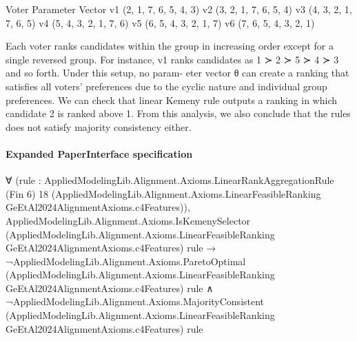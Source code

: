 \documentclass[10pt]{article}
\begin{document}
\begin{ReviewVerbatim}
                                      Voter    Parameter Vector
                                        v1     (2, 1, 7, 6, 5, 4, 3)
                                        v2     (3, 2, 1, 7, 6, 5, 4)
                                        v3     (4, 3, 2, 1, 7, 6, 5)
                                        v4     (5, 4, 3, 2, 1, 7, 6)
                                        v5     (6, 5, 4, 3, 2, 1, 7)
                                        v6     (7, 6, 5, 4, 3, 2, 1)

Each voter ranks candidates within the group in increasing order except for a single reversed group.
For instance, v1 ranks candidates as 1 ≻ 2 ≻ 5 ≻ 4 ≻ 3 and so forth. Under this setup, no param-
eter vector θ can create a ranking that satisfies all voters’ preferences due to the cyclic nature and
individual group preferences.
We can check that linear Kemeny rule outputs a ranking in which candidate 2 is ranked above 1.
From this analysis, we also conclude that the rules does not satisfy majority consistency either.
\end{ReviewVerbatim}



\paragraph{Expanded PaperInterface specification}
\begin{ReviewVerbatim}
∀
  (rule :
    AppliedModelingLib.Alignment.Axioms.LinearRankAggregationRule (Fin 6) 18
      (AppliedModelingLib.Alignment.Axioms.LinearFeasibleRanking GeEtAl2024AlignmentAxioms.c4Features)),
  AppliedModelingLib.Alignment.Axioms.IsKemenySelector
      (AppliedModelingLib.Alignment.Axioms.LinearFeasibleRanking GeEtAl2024AlignmentAxioms.c4Features) rule →
    ¬AppliedModelingLib.Alignment.Axioms.ParetoOptimal
          (AppliedModelingLib.Alignment.Axioms.LinearFeasibleRanking GeEtAl2024AlignmentAxioms.c4Features) rule ∧
      ¬AppliedModelingLib.Alignment.Axioms.MajorityConsistent
          (AppliedModelingLib.Alignment.Axioms.LinearFeasibleRanking GeEtAl2024AlignmentAxioms.c4Features) rule
\end{ReviewVerbatim}
\end{document}
